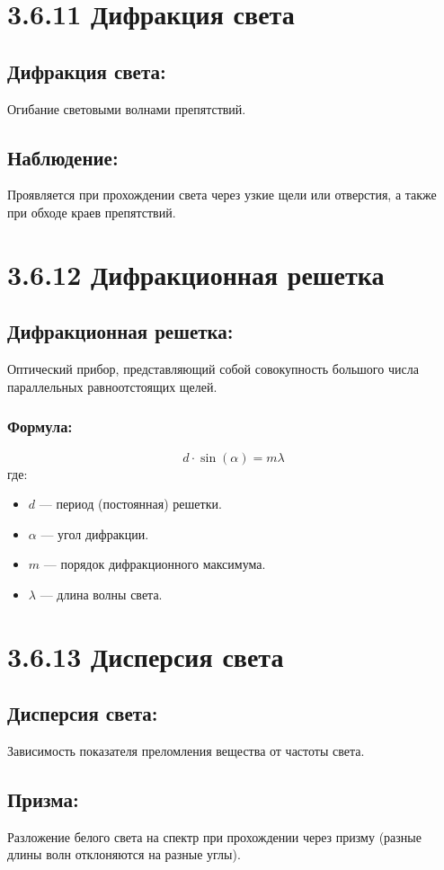 \documentclass[a4paper,12pt]{article}
\begin{document}
\section*{3.6.11 Дифракция света}
\vspace{-9pt}
\subsection*{Дифракция света:}
\vspace{-3pt}
Огибание световыми волнами препятствий.

\vspace{-9pt}
\subsection*{Наблюдение:}
\vspace{-3pt}
Проявляется при прохождении света через узкие щели или отверстия, а также при обходе краев препятствий.


\section*{3.6.12 Дифракционная решетка}
\vspace{-9pt}
\subsection*{Дифракционная решетка:}
\vspace{-3pt}
Оптический прибор, представляющий собой совокупность большого числа параллельных равноотстоящих щелей.

\vspace{-9pt}
\subsubsection*{Формула:}
\vspace{-0.05em}
$$ d \cdot \sin(\alpha) = m\lambda $$
где:
\begin{itemize}
    \item $d$ — период (постоянная) решетки.
    \item $\alpha$ — угол дифракции.
    \item $m$ — порядок дифракционного максимума.
    \item $\lambda$ — длина волны света.
\end{itemize}
\newpage
\section*{3.6.13 Дисперсия света}
\vspace{-9pt}
\subsection*{Дисперсия света:}
\vspace{-3pt}
Зависимость показателя преломления вещества от частоты света.

\vspace{-9pt}
\subsection*{Призма:}
\vspace{-3pt}
Разложение белого света на спектр при прохождении через призму (разные длины волн отклоняются на разные углы).
\end{document}
